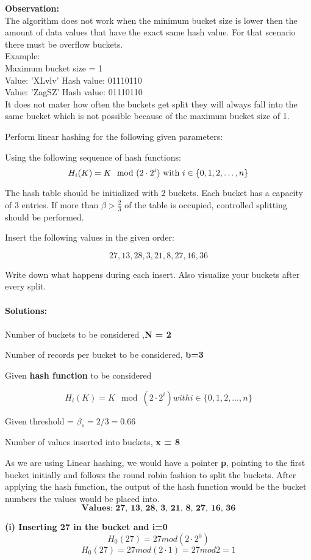 {\bf Observation:}\\
The algorithm does not work when the minimum bucket size is lower then the amount of data values that have the exact same hash value. For that scenario there must be overflow buckets.\\
Example:\\
Maximum bucket size = 1\\
Value: 'XLvlv' Hash value: 01110110\\
Value: 'ZagSZ' Hash value: 01110110\\
It does not mater how often the buckets get split they will always fall into the same bucket which is not possible because of the maximum bucket size of 1.

\newpage
{}

Perform linear hashing for the following given parameters:

Using the following sequence of hash functions:
\[
H_i(K) = K \mod (2 \cdot 2^i) \textnormal{ with } i \in \{0, 1, 2, \dots, n\}
\]

The hash table should be initialized with 2 buckets.
Each bucket has a capacity of 3 entries.
If more than $\beta > \frac{2}{3}$ of the table is occupied, controlled splitting should be performed.

Insert the following values in the given order:

\[
27, 13, 28, 3, 21, 8, 27, 16, 36
\]

Write down what happens during each insert.
Also visualize your buckets after every split.\\\\
{\bf Solutions:}\\\\
Number of buckets to be considered ,\textbf{N = 2}

Number of records per bucket to be considered, \textbf{b=3}

Given \textbf{hash function} to be considered 

    \[H_i(K) = K \mod (2 \cdot 2^i) with i \in \{0, 1, 2, \dots, n\}\]

Given threshold = $\beta_s = 2/3 = 0.66$

Number of values inserted into buckets, \textbf{x = 8}

As we are using Linear hashing, we would have a pointer\textbf{ p}, pointing to the first bucket initially and follows the round robin fashion to split the buckets.
After applying the hash function, the output of the hash function would be the bucket numbers the values would be placed into.
\[\textbf{Values: 27, 13, 28, 3, 21, 8, 27, 16, 36}\]
\begin{center}
  \textbf{(i) Inserting 27 in the bucket and i=0}
  \[H_0(27) = 27 mod (2 \cdot 2^0)\]
  \[H_0(27) = 27 mod (2 \cdot 1) = 27 mod 2 = 1\] 
    
\end{center}

